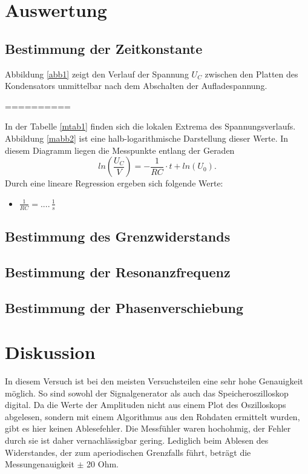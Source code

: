 \documentclass[11pt,ngerman,a4paper]{article}
\begin{document}
\section{Auswertung}
\subsection{Bestimmung der Zeitkonstante}
Abbildung \ref{abb1} zeigt den Verlauf der Spannung $U_C$ zwischen den Platten des Kondensators unmittelbar nach dem Abschalten der Aufladespannung. 

==========

In der Tabelle \ref{mtab1} finden sich die lokalen Extrema des Spannungsverlaufs. Abbildung \ref{mabb2} ist eine halb-logarithmische Darstellung dieser Werte. In diesem Diagramm liegen die Messpunkte entlang der Geraden
\begin{equation}
ln(\frac{U_C}{V}) = -\frac{1}{RC}\cdot t + ln(U_0).
\end{equation}
Durch eine lineare Regression ergeben sich folgende Werte:
\begin{itemize}
\item $\frac{1}{RC} = ....\,\frac{1}{s}$
\end{itemize}
\subsection{Bestimmung des Grenzwiderstands}
\subsection{Bestimmung der Resonanzfrequenz}
\subsection{Bestimmung der Phasenverschiebung}



\section{Diskussion}
In diesem Versuch ist bei den meisten Versuchsteilen eine sehr hohe Genauigkeit möglich. So sind sowohl der Signalgenerator als auch das Speicheroszilloskop digital. Da die Werte der Amplituden nicht aus einem Plot des Oszilloskops abgelesen, sondern mit einem Algorithmus aus den Rohdaten ermittelt wurden, gibt es hier keinen Ablesefehler. Die Messfühler waren hochohmig, der Fehler durch sie ist daher vernachlässigbar gering. Lediglich beim Ablesen des Widerstandes, der zum aperiodischen Grenzfalls führt, beträgt die Messungenauigkeit $\pm$ 20 Ohm.
\end{document}
